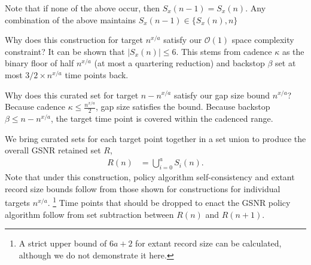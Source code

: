 Note that if none of the above occur, then $S_x(n - 1) = S_x(n)$.
Any combination of the above maintains $S_x(n - 1) \in \{S_x(n), n\}$


Why does this construction for target $n^{x/a}$ satisfy our $\mathcal{O}(1)$ space complexity constraint?
It can be shown that $|S_x(n)| \leq 6$.
This stems from cadence $\kappa$ as the binary floor of half $n^{x/a}$ (at most a quartering reduction) and backstop $\beta$ set at most $3/2 \times n^{x/a}$ time points back.






Why does this curated set for target $n - n^{x/a}$ satisfy our gap size bound $n^{x/a}$?
Because cadence $\kappa \leq \frac{n^{x/a}}{2}$, gap size satisfies the bound.
Because backstop $\beta \leq n - n ^{x/a}$, the target time point is covered within the cadenced range.

We bring curated sets for each target point together in a set union to produce the overall GSNR retained set $R$,
\begin{align*}
  R(n)
  &=
  \bigcup_{i=0}^{a} S_i(n).
\end{align*}
Note that under this construction, policy algorithm self-consistency and extant record size bounds follow from those shown for constructions for individual targets $n^{x/a}$.
\footnote{
A strict upper bound of $6a + 2$ for extant record size can be calculated, although we do not demonstrate it here.
}
Time points that should be dropped to enact the GSNR policy algorithm follow from set subtraction between $R(n)$ and $R(n+1)$.

